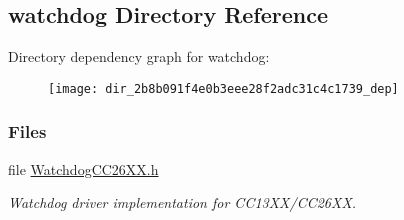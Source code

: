 \subsection{watchdog Directory Reference}
\label{dir_2b8b091f4e0b3eee28f2adc31c4c1739}
Directory dependency graph for watchdog\+:
\nopagebreak
\begin{figure}[H]
\begin{center}
\leavevmode
\texttt{[image: dir\_2b8b091f4e0b3eee28f2adc31c4c1739\_dep]}
\end{center}
\end{figure}
\subsubsection*{Files}
\begin{DoxyCompactItemize}
\item 
file \hyperlink{_watchdog_c_c26_x_x_8h}{Watchdog\+C\+C26\+X\+X.\+h}
\begin{DoxyCompactList}\small\item\em Watchdog driver implementation for C\+C13\+X\+X/\+C\+C26\+X\+X. \end{DoxyCompactList}\end{DoxyCompactItemize}
